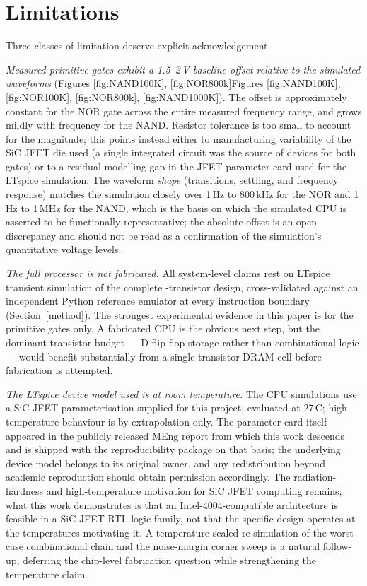 \section{Limitations}\label{sec:limitations}

Three classes of limitation deserve explicit acknowledgement.

\textit{Measured primitive gates exhibit a 1.5--2\,V baseline offset relative to the simulated waveforms} (\ifjxcdc Figures \ref{fig:NAND100K}, \ref{fig:NOR800k}\else Figures \ref{fig:NAND100K}, \ref{fig:NOR100K}, \ref{fig:NOR800k}, \ref{fig:NAND1000K}\fi). The offset is approximately constant for the NOR gate across the entire measured frequency range, and grows mildly with frequency for the NAND. Resistor tolerance is too small to account for the magnitude; this points instead either to manufacturing variability of the SiC JFET die used (a single integrated circuit was the source of devices for both gates) or to a residual modelling gap in the JFET parameter card used for the LTspice simulation. The waveform \emph{shape} (transitions, settling, and frequency response) matches the simulation closely over 1\,Hz to 800\,kHz for the NOR and 1\,Hz to 1\,MHz for the NAND, which is the basis on which the simulated CPU is asserted to be functionally representative; the absolute offset is an open discrepancy and should not be read as a confirmation of the simulation's quantitative voltage levels.

\textit{The full processor is not fabricated.} All system-level claims rest on LTspice transient simulation of the complete \TotalJFETCount{}-transistor design, cross-validated against an independent Python reference emulator at every instruction boundary (Section~\ref{method}). The strongest experimental evidence in this paper is for the primitive gates only. A fabricated CPU is the obvious next step, but the dominant transistor budget --- D flip-flop storage rather than combinational logic --- would benefit substantially from a single-transistor DRAM cell before fabrication is attempted.

\textit{The LTspice device model used is at room temperature.} The CPU simulations use a SiC JFET parameterisation supplied for this project, evaluated at 27\,\degree C; high-temperature behaviour is by extrapolation only. The parameter card itself appeared in the publicly released MEng report from which this work descends and is shipped with the reproducibility package on that basis; the underlying device model belongs to its original owner, and any redistribution beyond academic reproduction should obtain permission accordingly. The radiation-hardness and high-temperature motivation for SiC JFET computing remains; what this work demonstrates is that an Intel-4004-compatible architecture is feasible in a SiC JFET RTL logic family, not that the specific design operates at the temperatures motivating it. A temperature-scaled re-simulation of the worst-case combinational chain and the noise-margin corner sweep is a natural follow-up, deferring the chip-level fabrication question while strengthening the temperature claim.

